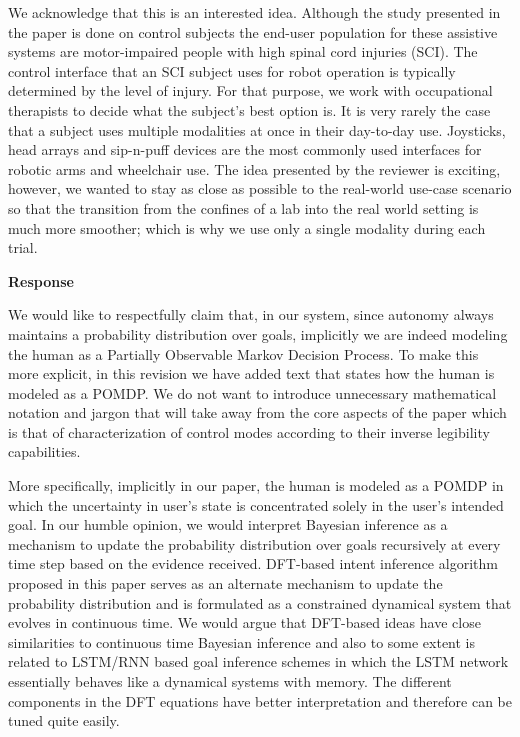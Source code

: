 \documentclass[a4paper,twoside,11pt]{reviewresponse}
\begin{document}
We acknowledge that this is an interested idea. Although the study presented in the paper is done on control subjects the end-user population for these assistive systems are motor-impaired people with high spinal cord injuries (SCI). The control interface that an SCI subject uses for robot operation is typically determined by the level of injury. For that purpose, we work with occupational therapists to decide what the subject's best option is. It is very rarely the case that a subject uses multiple modalities at once in their day-to-day use. Joysticks, head arrays and sip-n-puff devices are the most commonly used interfaces for robotic arms and wheelchair use. The idea presented by the reviewer is exciting, however, we wanted to stay as close as possible to the real-world use-case scenario so that the transition from the confines of a lab into the real world setting is much more smoother; which is why we use only a single modality during each trial. 


\textbf{Response}

We would like to respectfully claim that, in our system, since autonomy always maintains a probability distribution over goals, implicitly we are indeed modeling the human as a Partially Observable Markov Decision Process. To make this more explicit, in this revision we have added text that states how the human is modeled as a POMDP. We do not want to introduce unnecessary mathematical notation and jargon that will take away from the core aspects of the paper which is that of characterization of control modes according to their inverse legibility capabilities. 

More specifically, implicitly in our paper, the human is modeled as a POMDP in which the uncertainty in user's state is concentrated solely in the user's intended goal. In our humble opinion, we would interpret Bayesian inference as a mechanism to update the probability distribution over goals recursively at every time step based on the evidence received. DFT-based intent inference algorithm proposed in this paper serves as an alternate mechanism to update the probability distribution and is formulated as a constrained dynamical system that evolves in continuous time. We would argue that DFT-based ideas have close similarities to continuous time Bayesian inference and also to some extent is related to LSTM/RNN based goal inference schemes in which the LSTM network essentially behaves like a dynamical systems with memory. The different components in the DFT equations have better interpretation and therefore can be tuned quite easily. 
\end{document}
